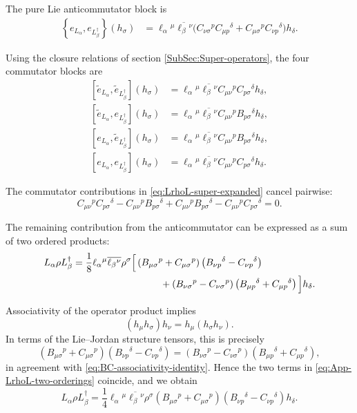 \documentclass[notitlepage,aip,reprint,onecolumn]{revtex4-1}
\theoremstyle{definition}
\renewcommand{\comm}[2]{\left[#1,#2\right]}
\newcommand{\acom}[2]{\left\{#1,#2\right\}}
\begin{document}
The pure Lie anticommutator block is
\[
\begin{aligned}
\acom{e_{L_\alpha}}
      {e_{L_\beta^\dagger}}(h_\sigma)
&=
\ell_\alpha{}^\mu
\overline{\ell_\beta{}^\nu}
\Big(
C_{\nu\sigma}{}^pC_{\mu p}{}^\delta
+
C_{\mu\sigma}{}^pC_{\nu p}{}^\delta
\Big)h_\delta.
\end{aligned}
\]

Using the closure relations of section \ref{SubSec:Super-operators}, the four commutator blocks are
\[
\begin{aligned}
\comm{\widetilde e_{L_\alpha}}
      {\widetilde e_{L_\beta^\dagger}}(h_\sigma)
&=
\ell_\alpha{}^\mu
\overline{\ell_\beta{}^\nu}
C_{\mu\nu}{}^pC_{p\sigma}{}^\delta h_\delta,
\\
\comm{\widetilde e_{L_\alpha}}
      {e_{L_\beta^\dagger}}(h_\sigma)
&=
\ell_\alpha{}^\mu
\overline{\ell_\beta{}^\nu}
C_{\mu\nu}{}^pB_{p\sigma}{}^\delta h_\delta,
\\
\comm{e_{L_\alpha}}
      {\widetilde e_{L_\beta^\dagger}}(h_\sigma)
&=
\ell_\alpha{}^\mu
\overline{\ell_\beta{}^\nu}
C_{\mu\nu}{}^pB_{p\sigma}{}^\delta h_\delta,
\\
\comm{e_{L_\alpha}}
      {e_{L_\beta^\dagger}}(h_\sigma)
&=
\ell_\alpha{}^\mu
\overline{\ell_\beta{}^\nu}
C_{\mu\nu}{}^pC_{p\sigma}{}^\delta h_\delta.
\end{aligned}
\]

The commutator contributions in  \eqref{eq:LrhoL-super-expanded} cancel pairwise:
\[
C_{\mu\nu}{}^pC_{p\sigma}{}^\delta
-
C_{\mu\nu}{}^pB_{p\sigma}{}^\delta
+
C_{\mu\nu}{}^pB_{p\sigma}{}^\delta
-
C_{\mu\nu}{}^pC_{p\sigma}{}^\delta
=
0.
\]

The remaining contribution from the anticommutator can be expressed as a sum of two ordered products:
\begin{align}
L_\alpha\rho L_\beta^\dagger
&=
\frac18
\ell_\alpha{}^\mu
\overline{\ell_\beta{}^\nu}
\rho^\sigma
\Big[
\left(
B_{\mu\sigma}{}^p
+
C_{\mu\sigma}{}^p
\right)
\left(
B_{\nu p}{}^\delta
-
C_{\nu p}{}^\delta
\right)
\notag\\
&\hspace{3.2cm}
+
\left(
B_{\nu\sigma}{}^p
-
C_{\nu\sigma}{}^p
\right)
\left(
B_{\mu p}{}^\delta
+
C_{\mu p}{}^\delta
\right)
\Big]h_\delta.
\label{eq:App-LrhoL-two-orderings}
\end{align}

Associativity of the operator product implies
\[
(h_\mu h_\sigma)h_\nu
=
h_\mu(h_\sigma h_\nu).
\]
In terms of the Lie--Jordan structure tensors, this is precisely
\[
\left(
B_{\mu\sigma}{}^p
+
C_{\mu\sigma}{}^p
\right)
\left(
B_{\nu p}{}^\delta
-
C_{\nu p}{}^\delta
\right)
=
\left(
B_{\nu\sigma}{}^p
-
C_{\nu\sigma}{}^p
\right)
\left(
B_{\mu p}{}^\delta
+
C_{\mu p}{}^\delta
\right),
\]
in agreement with \eqref{eq:BC-associativity-identity}. Hence the two terms in \eqref{eq:App-LrhoL-two-orderings} coincide, and we obtain
\begin{equation}\label{eq:App-LrhoL-BC-expanded}
L_\alpha\rho L_\beta^\dagger
=
\frac14
\ell_\alpha{}^\mu
\overline{\ell_\beta{}^\nu}
\rho^\sigma
\left(
B_{\mu\sigma}{}^p
+
C_{\mu\sigma}{}^p
\right)
\left(
B_{\nu p}{}^\delta
-
C_{\nu p}{}^\delta
\right)h_\delta.
\end{equation}
\end{document}
